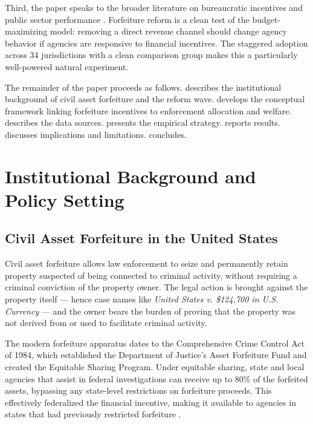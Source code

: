 \documentclass[12pt]{article}
\begin{document}
Third, the paper speaks to the broader literature on bureaucratic incentives and public sector performance \citep{finan2017personnel, rasul2018management}. Forfeiture reform is a clean test of the \citet{niskanen1971bureaucracy} budget-maximizing model: removing a direct revenue channel should change agency behavior if agencies are responsive to financial incentives. The staggered adoption across 34 jurisdictions with a clean comparison group makes this a particularly well-powered natural experiment.

The remainder of the paper proceeds as follows.  describes the institutional background of civil asset forfeiture and the reform wave.  develops the conceptual framework linking forfeiture incentives to enforcement allocation and welfare.  describes the data sources.  presents the empirical strategy.  reports results.  discusses implications and limitations.  concludes.


\section{Institutional Background and Policy Setting}
\label{sec:background}

\subsection{Civil Asset Forfeiture in the United States}

Civil asset forfeiture allows law enforcement to seize and permanently retain property suspected of being connected to criminal activity, without requiring a criminal conviction of the property owner. The legal action is brought against the property itself --- hence case names like \textit{United States v. \$124,700 in U.S. Currency} --- and the owner bears the burden of proving that the property was not derived from or used to facilitate criminal activity.

The modern forfeiture apparatus dates to the Comprehensive Crime Control Act of 1984, which established the Department of Justice's Asset Forfeiture Fund and created the Equitable Sharing Program. Under equitable sharing, state and local agencies that assist in federal investigations can receive up to 80\% of the forfeited assets, bypassing any state-level restrictions on forfeiture proceeds. This effectively federalized the financial incentive, making it available to agencies in states that had previously restricted forfeiture \citep{carpenter2020policing}.
\end{document}
